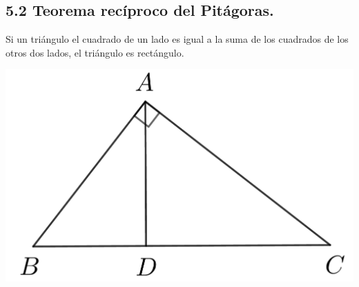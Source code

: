 \documentclass[12pt,a4paper]{article}
\begin{document}
\subsection*{5.2 Teorema recíproco del Pitágoras.}
Si un triángulo el cuadrado de un lado es igual a la suma de los cuadrados de los otros dos lados, el triángulo es rectángulo.
\begin{center}
\includegraphics[scale=0.8]{Imagenes/pitagoras.png} 
\end{center}
\end{document}

